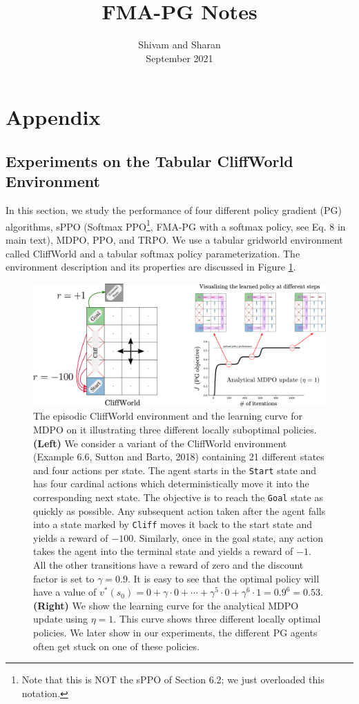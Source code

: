 \documentclass[a4paper, 10pt]{article}
\author{Shivam and Sharan
  \\ September 2021}
\date{}
\title{FMA-PG Notes}
\begin{document}
\maketitle
\vspace{-2cm}

\section{Appendix}
\subsection{Experiments on the Tabular CliffWorld Environment}
In this section, we study the performance of four different policy gradient (PG) algorithms, sPPO (Softmax PPO\footnote{Note that this is NOT the sPPO of Section 6.2; we just overloaded this notation.}, FMA-PG with a softmax policy, see Eq. 8 in main text), MDPO, PPO, and TRPO. We use a tabular gridworld environment called CliffWorld and a tabular softmax policy parameterization. The environment description and its properties are discussed in Figure \ref{fig: cliffworld}.

\begin{figure}[!hbp]
  \centering
  \includegraphics[scale=0.36]{tabular_figures/cliffworld.pdf}
  \caption{The episodic CliffWorld environment and the learning curve for MDPO on it illustrating three different locally suboptimal policies. \textbf{(Left)} We consider a variant of the CliffWorld environment (Example 6.6, Sutton and Barto, 2018) containing 21 different states and four actions per state. The agent starts in the \texttt{Start} state and has four cardinal actions which deterministically move it into the corresponding next state. The objective is to reach the \texttt{Goal} state as quickly as possible. Any subsequent action taken after the agent falls into a state marked by \texttt{Cliff} moves it back to the start state and yields a reward of $-100$. Similarly, once in the goal state, any action takes the agent into the terminal state and yields a reward of $-1$. All the other transitions have a reward of zero and the discount factor is set to $\gamma = 0.9$. It is easy to see that the optimal policy will have a value of $v^*(s_0) = 0 + \gamma \cdot 0 + \cdots + \gamma^5 \cdot 0 + \gamma^6 \cdot 1 = 0.9^6 = 0.53$. \textbf{(Right)} We show the learning curve for the analytical MDPO update using $\eta = 1$. This curve shows three different locally optimal policies. We later show in our experiments, the different PG agents often get stuck on one of these policies.}
  \label{fig: cliffworld}
\end{figure}
\end{document}
